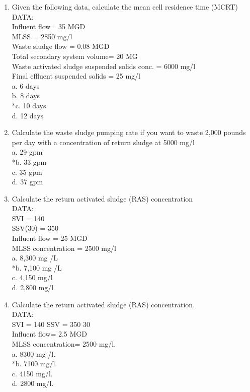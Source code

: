 \begin{enumerate}
\item Given the following data, calculate the mean cell residence time (MCRT)\\
DATA: \\
Influent flow= 35 MGD\\
MLSS = 2850 mg/l\\
Waste sludge flow = 0.08 MGD\\
Total secondary system volume= 20 MG\\
Waste activated sludge suspended solids conc. = 6000 mg/l\\
Final effluent suspended solids = 25 mg/l \\
a. 6 days \\
b. 8 days \\
*c. 10 days \\
d. 12 days \\

\item Calculate the waste sludge pumping rate if you want to waste 2,000 pounds per day with a concentration of return sludge at 5000 mg/l \\
a. 29 gpm \\
*b. 33 gpm \\
c. 35 gpm \\
d. 37 gpm \\

\item Calculate the return activated sludge (RAS) concentration\\
DATA: \\
SVI = 140 \\
SSV(30) = 350\\
Influent flow = 25 MGD\\
MLSS concentration = 2500 mg/l \\
a. 8,300 mg /L \\
*b. 7,100 mg /L \\
c. 4,150 mg/l \\
d. 2,800 mg/l \\

\item Calculate the return activated sludge (RAS) concentration.\\
DATA:\\
SVI = 140 SSV  = 350 30\\
Influent flow= 2.5 MGD\\
MLSS concentration= 2500 mg/l. \\
a. 8300 mg /l. \\
*b. 7100 mg/l. \\
c. 4150 mg/l. \\
d. 2800 mg/l. \\


\end{enumerate}
